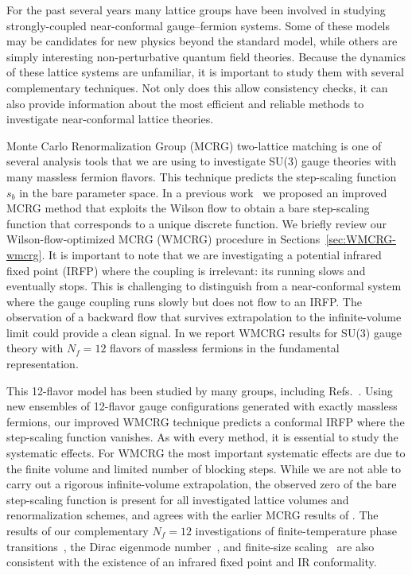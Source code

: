 
For the past several years many lattice groups have been involved in studying strongly-coupled near-conformal gauge--fermion systems.
Some of these models may be candidates for new physics beyond the standard model, while others are simply interesting non-perturbative quantum field theories.
Because the dynamics of these lattice systems are unfamiliar, it is important to study them with several complementary techniques.
Not only does this allow consistency checks, it can also provide information about the most efficient and reliable methods to investigate near-conformal lattice theories.

Monte Carlo Renormalization Group (MCRG) two-lattice matching is one of several analysis tools that we are using to investigate SU(3) gauge theories with many massless fermion flavors.
This technique predicts the step-scaling function $s_b$ in the bare parameter space.
In a previous work~\cite{Petropoulos:2012mg} we proposed an improved MCRG method that exploits the Wilson flow to obtain a bare step-scaling function that corresponds to a unique discrete \be function.
We briefly review our Wilson-flow-optimized MCRG (WMCRG) procedure in Sections~\ref{sec:WMCRG-wmcrg}.
It is important to note that we are investigating a potential infrared fixed point (IRFP) where the coupling is irrelevant: its running slows and eventually stops.
This is challenging to distinguish from a near-conformal system where the gauge coupling runs slowly but does not flow to an IRFP.
The observation of a backward flow that survives extrapolation to the infinite-volume limit could provide a clean signal.
In  we report WMCRG results for SU(3) gauge theory with $N_f = 12$ flavors of massless fermions in the fundamental representation.

This 12-flavor model has been studied by many groups, including Refs.~\cite{Appelquist:2009ty, Deuzeman:2009mh, Fodor:2011tu, Appelquist:2011dp, Hasenfratz:2011xn, DeGrand:2011cu, Cheng:2011ic, Jin:2012dw, Lin:2012iw, Aoki:2012eq, Fodor:2012uw, Fodor:2012et, Itou:2012qn, Cheng:2013eu, Aoki:2013pca, Hasenfratz:2013uha, Hasenfratz:2013eka, Cheng:2013bca}.
Using new ensembles of 12-flavor gauge configurations generated with exactly massless fermions, our improved WMCRG technique predicts a conformal IRFP where the step-scaling function vanishes.
As with every method, it is essential to study the systematic effects.
For WMCRG the most important systematic effects are due to the finite volume and limited number of blocking steps.
While we are not able to carry out a rigorous infinite-volume extrapolation, the observed zero of the bare step-scaling function is present for all investigated lattice volumes and renormalization schemes, and agrees with the earlier MCRG results of .
The results of our complementary $N_f = 12$ investigations of finite-temperature phase transitions~\cite{Schaich:2012fr, Hasenfratz:2013uha}, the Dirac eigenmode number~\cite{Cheng:2013eu, Cheng:2013bca}, and finite-size scaling~\cite{Hasenfratz:2013eka} are also consistent with the existence of an infrared fixed point and IR conformality.
